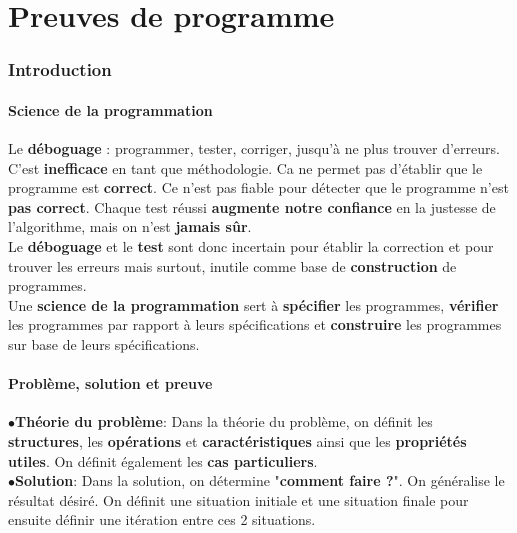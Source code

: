 \part{Preuves de programme}
\section{Introduction}

\subsection{Science de la programmation}
Le \textbf{déboguage} : programmer, tester, corriger, jusqu'à ne plus trouver d'erreurs. C'est \textbf{inefficace} en tant que méthodologie. Ca ne permet pas d'établir que le programme est \textbf{correct}. Ce n'est pas fiable pour détecter que le programme n'est \textbf{pas correct}. Chaque test réussi \textbf{augmente notre confiance} en la justesse de l'algorithme, mais on n'est \textbf{jamais sûr}.\\

Le \textbf{déboguage} et le \textbf{ test} sont donc incertain pour établir la correction et pour trouver les erreurs mais surtout, inutile comme base de \textbf{construction} de programmes.\\

Une \textbf{science de la programmation} sert à \textbf{spécifier} les programmes, \textbf{vérifier} les programmes par rapport à leurs spécifications et \textbf{construire} les programmes sur base de leurs spécifications.


\subsection{Problème, solution et preuve}
$\bullet$\textbf{Théorie du problème}:
Dans la théorie du problème, on définit les \textbf{structures}, les \textbf{opérations} et \textbf{caractéristiques} ainsi que les \textbf{propriétés utiles}. On définit également les \textbf{cas particuliers}.\\

$\bullet$\textbf{Solution}:
Dans la solution, on détermine "\textbf{comment faire ?}". On généralise le résultat désiré. On définit une situation initiale et une situation finale pour ensuite définir une itération entre ces 2 situations.\\

